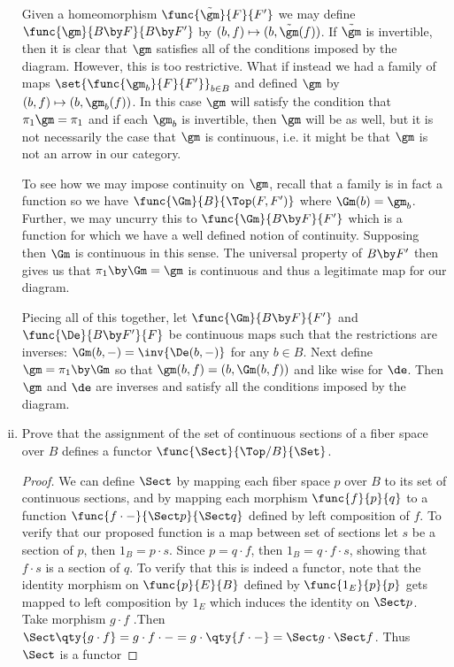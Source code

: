 \documentclass[../../main]{subfiles}
\begin{document}
\begin{exercise}
\begin{enumerate}[(i),resume]
			Given a homeomorphism \(\func{\tilde{\gm}}{F}{F'}\) we may define
			\(\func{\gm}{B\by F}{B\by F'}\) by
			\((b,f)\mapsto(b,\tilde{\gm}(f))\). If \(\tilde{\gm}\) is
			invertible, then it is clear that \(\gm\) satisfies all of the
			conditions imposed by the diagram. However, this is too restrictive.
			What if instead we had a family of maps
			\(\set{\func{\gm_b}{F}{F'}}_{b\in B}\) and defined \(\gm\) by
			\((b,f)\mapsto(b,\gm_b(f))\). In this case \(\gm\) will satisfy the
			condition that \(\pi_1\gm=\pi_1\) and if each \(\gm_b\) is
			invertible, then \(\gm\) will be as well, but it is not necessarily
			the case that \(\gm\) is continuous, i.e. it might be that \(\gm\)
			is not an arrow in our category.

			To see how we may impose continuity on \(\gm\), recall that a family
			is in fact a function so we have \(\func{\Gm}{B}{\Top(F,F')}\) where
			\(\Gm(b)=\gm_b\). Further, we may uncurry this to
			\(\func{\Gm}{B\by F}{F'}\) which is a function for which we have a
			well defined notion of continuity. Supposing then \(\Gm\) is
			continuous in this sense. The universal property of \(B\by F'\) then
			gives us that \(\pi_1\by\Gm=\gm\) is continuous and thus a
			legitimate map for our diagram.

			Piecing all of this together, let \(\func{\Gm}{B\by F}{F'}\) and
			\(\func{\De}{B\by F'}{F}\) be continuous maps such that the
			restrictions are inverses:
			\(\Gm(b,-)=\inv{\De(b,-)}\) for any \(b\in B\). Next define
			\(\gm=\pi_1\by\Gm\) so that \(\gm(b,f)=(b,\Gm(b,f))\) and like wise
			for \(\de\). Then \(\gm\) and \(\de\) are inverses and satisfy all
			the conditions imposed by the diagram.

		\item Prove that the assignment of the set of continuous sections of a
			fiber space over \(B\) defines a functor
			\(\func{\Sect}{\Top/B}{\Set}\).
			\begin{proof}
				We can define $\Sect$ by mapping each fiber space $p$ over $B$
				to its set of continuous sections, and by mapping each morphism
				$\func{f}{p}{q}$ to a function $\func{f \cdot -}{\Sect p}{\Sect
				q}$ defined by left composition of $f$. To verify that our
				proposed function is a map between set of sections let $s$ be a
				section of $p$, then $1_{B} = p \cdot s$. Since $p = q \cdot f$,
				then $1_{B} = q \cdot f \cdot s$, showing that $f \cdot s$ is a
				section of $q$. To verify that this is indeed a functor, note
				that the identity morphism on $\func{p}{E}{B}$ defined by
				$\func{1_{E}}{p}{p}$ gets mapped to left composition by $1_{E}$
				which induces the identity on $\Sect p$. Take morphism $g \cdot
				f$ .Then $\Sect \qty{g \cdot f} = g \cdot f \cdot - = g \cdot
				\qty{f \cdot -} = \Sect g \cdot \Sect f$. Thus $\Sect$ is a
				functor
			\end{proof}


\end{enumerate}
\end{exercise}
\end{document}
